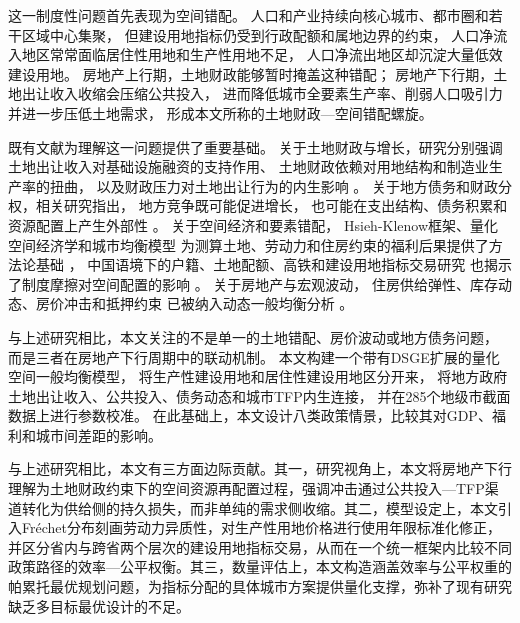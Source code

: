 \documentclass[UTF8,a4paper,12pt]{ctexart}
\theoremstyle{plain}
\theoremstyle{definition}
\theoremstyle{remark}
\begin{document}
这一制度性问题首先表现为空间错配。
人口和产业持续向核心城市、都市圈和若干区域中心集聚，
但建设用地指标仍受到行政配额和属地边界的约束，
人口净流入地区常常面临居住性用地和生产性用地不足，
人口净流出地区却沉淀大量低效建设用地。
房地产上行期，土地财政能够暂时掩盖这种错配；
房地产下行期，土地出让收入收缩会压缩公共投入，
进而降低城市全要素生产率、削弱人口吸引力并进一步压低土地需求，
形成本文所称的土地财政—空间错配螺旋。

既有文献为理解这一问题提供了重要基础。
关于土地财政与增长，研究分别强调土地出让收入对基础设施融资的支持作用、
土地财政依赖对用地结构和制造业生产率的扭曲，
以及财政压力对土地出让行为的内生影响
\citep{chen2016,liu2021,zhao2015,fan2019,liu2018}。
关于地方债务和财政分权，相关研究指出，
地方竞争既可能促进增长，
也可能在支出结构、债务积累和资源配置上产生外部性
\citep{bai2016,luo2022,fuyong2007,qiantingyi1994,tiebout1956,oates1972,musgrave1959}。
关于空间经济和要素错配，
Hsieh-Klenow框架、量化空间经济学和城市均衡模型
为测算土地、劳动力和住房约束的福利后果提供了方法论基础
\citep{hsiehklenow2009,eaton2002,ahlfeldt2015,redding2017,fajgelbaum2019,
henderson1974,rosen1979,roback1982,hsiehmoretti2019,diamond2016}，
中国语境下的户籍、土地配额、高铁和建设用地指标交易研究
也揭示了制度摩擦对空间配置的影响
\citep{wang2020,lu2019,yan2021,kline2014,chen2020,lu2020}。
关于房地产与宏观波动，
住房供给弹性、库存动态、房价冲击和抵押约束
已被纳入动态一般均衡分析
\citep{glaeser2005,gyourko2013,favilukis2017,chen2017,huang2018,
kiyotakimoore1997,iacoviello2005,liuetal2013,chen2016b}。

与上述研究相比，本文关注的不是单一的土地错配、房价波动或地方债务问题，
而是三者在房地产下行周期中的联动机制。
本文构建一个带有DSGE扩展的量化空间一般均衡模型，
将生产性建设用地和居住性建设用地区分开来，
将地方政府土地出让收入、公共投入、债务动态和城市TFP内生连接，
并在285个地级市截面数据上进行参数校准。
在此基础上，本文设计八类政策情景，比较其对GDP、福利和城市间差距的影响。

与上述研究相比，本文有三方面边际贡献。其一，研究视角上，本文将房地产下行理解为土地财政约束下的空间资源再配置过程，强调冲击通过公共投入—TFP渠道转化为供给侧的持久损失，而非单纯的需求侧收缩。其二，模型设定上，本文引入Fréchet分布刻画劳动力异质性，对生产性用地价格进行使用年限标准化修正，并区分省内与跨省两个层次的建设用地指标交易，从而在一个统一框架内比较不同政策路径的效率—公平权衡。其三，数量评估上，本文构造涵盖效率与公平权重的帕累托最优规划问题，为指标分配的具体城市方案提供量化支撑，弥补了现有研究缺乏多目标最优设计的不足。

\end{document}
